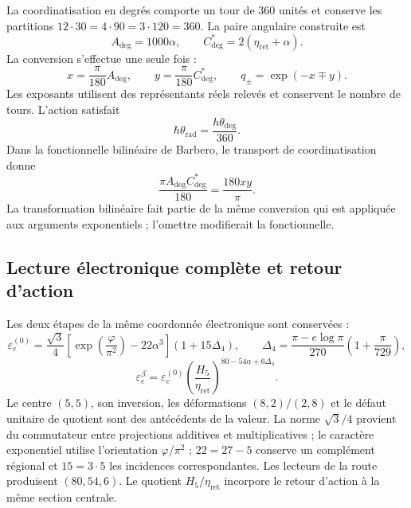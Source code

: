 La coordinatisation en degrés comporte un tour de $360$ unités et conserve les
partitions $12\cdot30=4\cdot90=3\cdot120=360$. La paire angulaire construite est
\begin{equation}
 A_{\deg}=1000\alpha,
 \qquad C^*_{\deg}=2(\eta_{\mathrm{ret}}+\alpha).
 \label{md:compos:par-angular}
\end{equation}
La conversion s’effectue une seule fois :
\begin{equation}
 x=\frac{\pi}{180}A_{\deg},\qquad
 y=\frac{\pi}{180}C^*_{\deg},\qquad
 q_\pm=\exp(-x\mp y).
 \label{md:compos:canales}
\end{equation}
Les exposants utilisent des représentants réels relevés et conservent le
nombre de tours. L’action satisfait
\begin{equation}
 \hbar\theta_{\mathrm{rad}}
 =\frac{h\theta_{\deg}}{360}.
 \label{md:compos:accion-cartas}
\end{equation}
Dans la fonctionnelle bilinéaire de Barbero, le transport de coordinatisation donne
\begin{equation}
 \frac{\pi A_{\deg}C^*_{\deg}}{180}
 =\frac{180xy}{\pi}.
 \label{md:compos:bilineal-cartas}
\end{equation}
La transformation bilinéaire fait partie de la même conversion qui est appliquée
aux arguments exponentiels ; l’omettre modifierait la fonctionnelle.

\subsection{Lecture électronique complète et retour d’action}
\label{md:compos:electron}

Les deux étapes de la même coordonnée électronique sont conservées :
\begin{equation}
 \varepsilon_e^{(0)}=\frac{\sqrt{3}}{4}
 \left[\exp\!\left(\frac{\varphi}{\pi^2}\right)-22\alpha^3\right]
 (1+15\Delta_4),\qquad
 \Delta_4=\frac{\pi-e\log\pi}{270}
 \left(1+\frac{\pi}{729}\right),
 \label{md:compos:electron-basal}
\end{equation}
\begin{equation}
 \boxed{\varepsilon_e^\beta=\varepsilon_e^{(0)}
 \left(\frac{H_5}{\eta_{\mathrm{ret}}}\right)^{80-54\alpha+6\Delta_4}.}
 \label{md:compos:electron-completo}
\end{equation}
Le centre $(5,5)$, son inversion, les déformations $(8,2)/(2,8)$ et le
défaut unitaire de quotient sont des antécédents de la valeur. La norme
$\sqrt{3}/4$ provient du commutateur entre projections additives et
multiplicatives ; le caractère exponentiel utilise l’orientation
$\varphi/\pi^2$ ; $22=27-5$ conserve un complément régional et $15=3\cdot5$
les incidences correspondantes. Les lecteurs de la route produisent
$(80,54,6)$. Le quotient $H_5/\eta_{\mathrm{ret}}$ incorpore le retour
d’action à la même section centrale.

